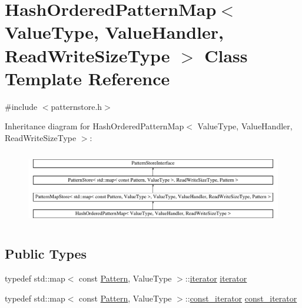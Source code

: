 \hypertarget{classHashOrderedPatternMap}{}\section{Hash\+Ordered\+Pattern\+Map$<$ Value\+Type, Value\+Handler, Read\+Write\+Size\+Type $>$ Class Template Reference}
\label{classHashOrderedPatternMap}


{\ttfamily \#include $<$patternstore.\+h$>$}

Inheritance diagram for Hash\+Ordered\+Pattern\+Map$<$ Value\+Type, Value\+Handler, Read\+Write\+Size\+Type $>$\+:\begin{figure}[H]
\begin{center}
\leavevmode
\includegraphics[height=3.303835cm]{classHashOrderedPatternMap}
\end{center}
\end{figure}
\subsection*{Public Types}
\begin{DoxyCompactItemize}
\item 
typedef std\+::map$<$ const \hyperlink{classPattern}{Pattern}, Value\+Type $>$\+::\hyperlink{classHashOrderedPatternMap_a149481ae49379713dae0ffcaff294f65}{iterator} \hyperlink{classHashOrderedPatternMap_a149481ae49379713dae0ffcaff294f65}{iterator}
\item 
typedef std\+::map$<$ const \hyperlink{classPattern}{Pattern}, Value\+Type $>$\+::\hyperlink{classHashOrderedPatternMap_a0162fc35654440e11ea66e71e8ffe8f8}{const\+\_\+iterator} \hyperlink{classHashOrderedPatternMap_a0162fc35654440e11ea66e71e8ffe8f8}{const\+\_\+iterator}
\end{DoxyCompactItemize}
